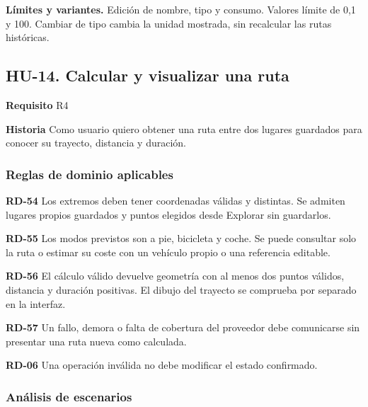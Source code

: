 {\fontsize{9}{11.8}\selectfont\textbf{Límites y variantes.} Edición de nombre, tipo y consumo. Valores límite de 0,1 y 100. Cambiar de tipo cambia la unidad mostrada, sin recalcular las rutas históricas.\par}\vspace{4pt}
\clearpage\subsection*{HU-14. Calcular y visualizar una ruta}

\textbf{Requisito} R4\par

\textbf{Historia} Como usuario quiero obtener una ruta entre dos lugares guardados para conocer su trayecto, distancia y duración.\par

\subsubsection*{Reglas de dominio aplicables}

\textbf{RD-54} Los extremos deben tener coordenadas válidas y distintas. Se admiten lugares propios guardados y puntos elegidos desde Explorar sin guardarlos.\par

\textbf{RD-55} Los modos previstos son a pie, bicicleta y coche. Se puede consultar solo la ruta o estimar su coste con un vehículo propio o una referencia editable.\par

\textbf{RD-56} El cálculo válido devuelve geometría con al menos dos puntos válidos, distancia y duración positivas. El dibujo del trayecto se comprueba por separado en la interfaz.\par

\textbf{RD-57} Un fallo, demora o falta de cobertura del proveedor debe comunicarse sin presentar una ruta nueva como calculada.\par

\textbf{RD-06} Una operación inválida no debe modificar el estado confirmado.\par

\subsubsection*{Análisis de escenarios}

